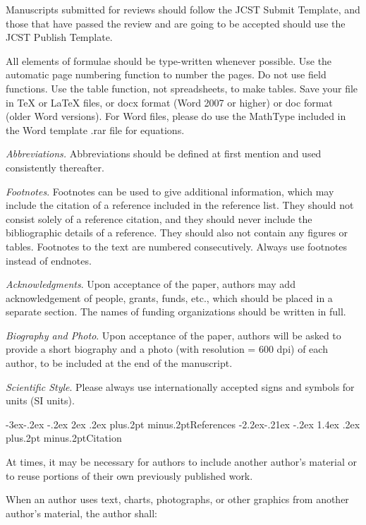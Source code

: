 \documentclass[twoside]{article}
\makeatletter
\def\subsection{\@startsection{subsection}{2}{\z@}%
 {-3ex\@plus -.2ex \@minus -.2ex}%
 {2ex \@plus.2ex}%
{\normalfont\normalsize\protect\baselineskip=12.5pt plus.2pt minus.2pt\bfseries}}
\def\subsubsection{\@startsection{subsubsection}{3}{\z@}%
 {-2.2ex\@plus -.21ex \@minus -.2ex}%
 {1.4ex \@plus.2ex}
{\normalfont\normalsize\protect\baselineskip=12pt plus.2pt minus.2pt\sl}}
\makeatother
\begin{document}
\begin{multicols}{2}
Manuscripts submitted for reviews should follow the JCST Submit Template, and those that have passed the review and are going to be accepted should use the JCST Publish Template.

All elements of formulae should be type-written whenever possible. Use the automatic page numbering function to number the pages. Do not use field functions. Use the table function, not spreadsheets, to make tables. Save your file in TeX or LaTeX files, or docx format (Word 2007 or higher) or doc format (older Word versions). For Word files, please do use the MathType included in the Word template .rar file for equations.

{\it Abbreviations.} Abbreviations should be defined at first mention and used consistently thereafter.

{\it Footnotes}. Footnotes can be used to give additional information, which may include the citation of a reference included in the reference list. They should not consist solely of a reference citation, and they should never include the bibliographic details of a reference. They should also not contain any figures or tables. Footnotes to the text are numbered consecutively. Always use footnotes instead of endnotes.

{\it Acknowledgments}. Upon acceptance of the paper, authors may add acknowledgement of people, grants, funds, etc., which should be placed in a separate section. The names of funding organizations should be written in full.

{\it Biography and Photo}. Upon acceptance of the paper, authors will be asked to provide a short biography and a photo (with resolution = 600 dpi) of each author, to be included at the end of the manuscript.

{\it Scientific Style}. Please always use internationally accepted signs and symbols for units (SI units).

\subsection{References}
\subsubsection{Citation}

At times, it may be necessary for authors to include another author's material or to reuse portions of their own previously published work.

When an author uses text, charts, photographs, or other graphics from another author's material, the author shall:


\end{multicols}
\end{document}
